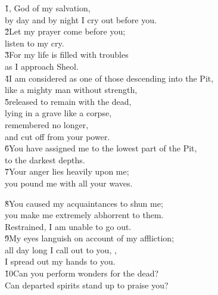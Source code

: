 \begin{poetry}
\poeml \v{1}, God of my salvation, \\
\poemll    by day and by night I cry out before you. \\
\poeml \v{2}Let my prayer come before you; \\
\poemll    listen to my cry. \\
\poeml \v{3}For my life is filled with troubles \\
\poemll    as I approach Sheol. \\
\poeml \v{4}I am considered as one of those descending into the Pit, \\
\poemll    like a mighty man without strength, \\
\poeml \v{5}released to remain with the dead, \\
\poemll    lying in a grave like a corpse, \\
\poeml remembered no longer, \\
\poemll    and cut off from your power. \\
\poeml \v{6}You have assigned me to the lowest part of the Pit, \\
\poemll    to the darkest depths. \\
\poeml \v{7}Your anger lies heavily upon me; \\
\poemll    you pound me with all your waves.
\end{poetry}

\begin{poetry}
\poeml \v{8}You caused my acquaintances to shun me; \\
\poemll    you make me extremely abhorrent to them. \\
\poemlll       Restrained, I am unable to go out. \\
\poeml \v{9}My eyes languish on account of my affliction; \\
\poemll    all day long I call out to you, , \\
\poemlll       I spread out my hands to you. \\
\poeml \v{10}Can you perform wonders for the dead? \\
\poemll    Can departed spirits stand up to praise you?
\end{poetry}

